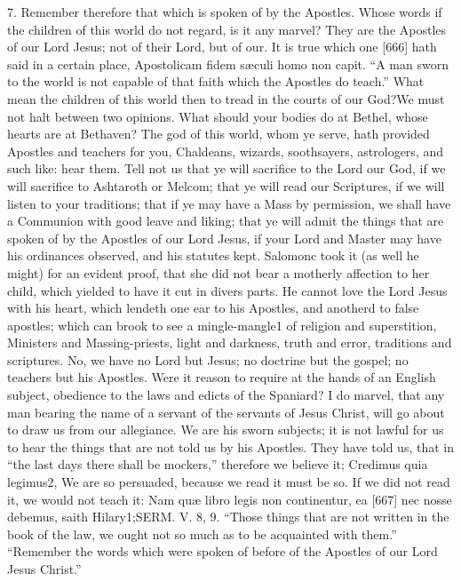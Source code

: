 7. Remember therefore that which is spoken of by the Apostles. Whose words if the children of this world do not regard, is it any marvel? They are the Apostles of our Lord Jesus; not of their Lord, but of our. It is true which one [666] hath said in a certain place, Apostolicam fidem sæculi homo non capit. “A man sworn to the world is not capable of that faith which the Apostles do teach.” What mean the children of this world then to tread in the courts of our God?We must not halt between two opinions. What should your bodies do at Bethel, whose hearts are at Bethaven? The god of this world, whom ye serve, hath provided Apostles and teachers for you, Chaldeans, wizards, soothsayers, astrologers, and such like: hear them. Tell not us that ye will sacrifice to the Lord our God, if we will sacrifice to Ashtaroth or Melcom; that ye will read our Scriptures, if we will listen to your traditions; that if ye may have a Mass by permission, we shall have a Communion with good leave and liking; that ye will admit the things that are spoken of by the Apostles of our Lord Jesus, if your Lord and Master may have his ordinances observed, and his statutes kept. Salomonc took it (as well he might) for an evident proof, that she did not bear a motherly affection to her child, which yielded to have it cut in divers parts. He cannot love the Lord Jesus with his heart, which lendeth one ear to his Apostles, and anotherd to false apostles; which can brook to see a mingle-mangle1 of religion and superstition, Ministers and Massing-priests, light and darkness, truth and error, traditions and scriptures. No, we have no Lord but Jesus; no doctrine but the gospel; no teachers but his Apostles. Were it reason to require at the hands of an English subject, obedience to the laws and edicts of the Spaniard? I do marvel, that any man bearing the name of a servant of the servants of Jesus Christ, will go about to draw us from our allegiance. We are his sworn subjects; it is not lawful for us to hear the things that are not told us by his Apostles. They have told us, that in “the last days there shall be mockers,” therefore we believe it; Credimus quia legimus2, We are so persuaded, because we read it must be so. If we did not read it, we would not teach it: Nam quæ libro legis non continentur, ea [667] nec nosse debemus, saith Hilary1;SERM. V. 8, 9. “Those things that are not written in the book of the law, we ought not so much as to be acquainted with them.” “Remember the words which were spoken of before of the Apostles of our Lord Jesus Christ.”

